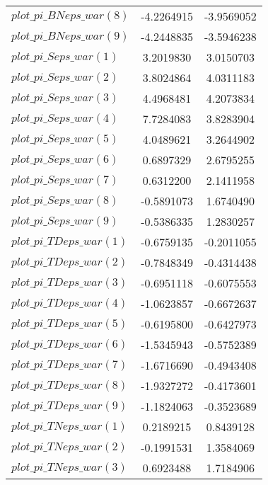 \begin{center}
\begin{longtable}{lcc}
$plot\_pi\_BN eps\_war (8)   $	 & 	     -4.2264915	 & 	     -3.9569052 \\ 
$plot\_pi\_BN eps\_war (9)   $	 & 	     -4.2448835	 & 	     -3.5946238 \\ 
$plot\_pi\_S eps\_war (1)    $	 & 	      3.2019830	 & 	      3.0150703 \\ 
$plot\_pi\_S eps\_war (2)    $	 & 	      3.8024864	 & 	      4.0311183 \\ 
$plot\_pi\_S eps\_war (3)    $	 & 	      4.4968481	 & 	      4.2073834 \\ 
$plot\_pi\_S eps\_war (4)    $	 & 	      7.7284083	 & 	      3.8283904 \\ 
$plot\_pi\_S eps\_war (5)    $	 & 	      4.0489621	 & 	      3.2644902 \\ 
$plot\_pi\_S eps\_war (6)    $	 & 	      0.6897329	 & 	      2.6795255 \\ 
$plot\_pi\_S eps\_war (7)    $	 & 	      0.6312200	 & 	      2.1411958 \\ 
$plot\_pi\_S eps\_war (8)    $	 & 	     -0.5891073	 & 	      1.6740490 \\ 
$plot\_pi\_S eps\_war (9)    $	 & 	     -0.5386335	 & 	      1.2830257 \\ 
$plot\_pi\_TD eps\_war (1)   $	 & 	     -0.6759135	 & 	     -0.2011055 \\ 
$plot\_pi\_TD eps\_war (2)   $	 & 	     -0.7848349	 & 	     -0.4314438 \\ 
$plot\_pi\_TD eps\_war (3)   $	 & 	     -0.6951118	 & 	     -0.6075553 \\ 
$plot\_pi\_TD eps\_war (4)   $	 & 	     -1.0623857	 & 	     -0.6672637 \\ 
$plot\_pi\_TD eps\_war (5)   $	 & 	     -0.6195800	 & 	     -0.6427973 \\ 
$plot\_pi\_TD eps\_war (6)   $	 & 	     -1.5345943	 & 	     -0.5752389 \\ 
$plot\_pi\_TD eps\_war (7)   $	 & 	     -1.6716690	 & 	     -0.4943408 \\ 
$plot\_pi\_TD eps\_war (8)   $	 & 	     -1.9327272	 & 	     -0.4173601 \\ 
$plot\_pi\_TD eps\_war (9)   $	 & 	     -1.1824063	 & 	     -0.3523689 \\ 
$plot\_pi\_TN eps\_war (1)   $	 & 	      0.2189215	 & 	      0.8439128 \\ 
$plot\_pi\_TN eps\_war (2)   $	 & 	     -0.1991531	 & 	      1.3584069 \\ 
$plot\_pi\_TN eps\_war (3)   $	 & 	      0.6923488	 & 	      1.7184906 \\ 

\end{longtable}
\end{center}
